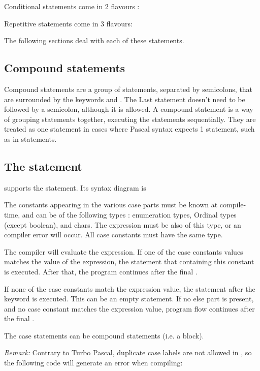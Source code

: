 \documentclass{report}
\begin{document}
Conditional statements come in 2 flavours : 



Repetitive statements come in 3 flavours:



The following sections deal with each of these statements.

\subsection{Compound statements}
Compound statements are a group of statements, separated by semicolons,
that are surrounded by the keywords  and . The
Last statement doesn't need to be followed by a semicolon, although it is
allowed. A compound statement is a way of grouping statements together, 
executing the statements sequentially. They are treated as one statement 
in cases where Pascal syntax expects 1 statement, such as in 
 statements.



\subsection{The  statement}
\fpc supports the  statement. Its syntax diagram is



The constants appearing in the various case parts must be known at 
compile-time, and can be of the following types : enumeration types, 
Ordinal types (except boolean), and chars. The expression must be also of
this type, or an compiler error will occur. All case constants must 
have the same type.

The compiler will evaluate the expression. If one of the case constants
values matches the value of the expression, the statement that containing
this constant is executed. After that, the program continues after the final
.

If none of the case constants match the expression value, the statement
after the  keyword is executed. This can be an empty statement.
If no else part is present, and no case constant matches the expression
value, program flow continues after the final .

The case statements can be compound statements 
(i.e. a  block).

{\em Remark:} Contrary to Turbo Pascal, duplicate case labels are not
allowed in \fpc, so the following code will generate an error when
compiling:
\end{document}
